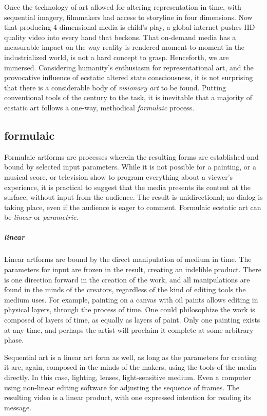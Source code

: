 \documentclass{UIdahoMastersThesis}
\begin{document}
Once the technology of art allowed for altering representation in time, with sequential imagery, filmmakers had access to storyline in four dimensions. Now that producing 4-dimensional media is child's play, a global internet pushes HD quality video into every hand that beckons. That on-demand media has a measurable impact on the way reality is rendered moment-to-moment in the industrialized world, is not a hard concept to grasp. Henceforth, we are immersed.
Considering humanity's enthusiasm for representational art, and the provocative influence of ecstatic altered state consciousness, it is not surprising that there is a considerable body of \emph{visionary art} to be found. Putting conventional tools of the  century to the task, it is inevitable that a majority of ecstatic art follows a one-way, methodical \emph{formulaic} process. 


\subsection{formulaic}

Formulaic artforms are processes wherein the resulting forms are established and bound by selected input parameters. While it is not possible for a painting, or a musical score, or television show to program everything about a viewer's experience, it is practical to suggest that the media presents its content at the surface, without input from the audience. The result is unidirectional; no dialog is taking place, even if the audience is eager to comment.
Formulaic ecstatic art can be \emph{linear} or \emph{parametric}.

\subparagraph{linear}

Linear artforms are bound by the direct manipulation of medium in time. The parameters for input are frozen in the result, creating an indelible product. There is one direction forward in the creation of the work, and all manipulations are found in the minds of the creators, regardless of the kind of editing tools the medium uses. For example, painting on a canvas with oil paints allows editing in physical layers, through the process of time. One could philosophize the work is composed of layers of time, as equally as layers of paint. Only one painting exists at any time, and perhaps the artist will proclaim it complete at some arbitrary phase. 

Sequential art is a linear art form as well, as long as the parameters for creating it are, again, composed in the minds of the makers, using the tools of the media directly. In this case, lighting, lenses, light-sensitive medium. Even a computer using non-linear editing software for adjusting the sequence of frames. The resulting video is a linear product, with one expressed intention for reading its message.
\end{document}
